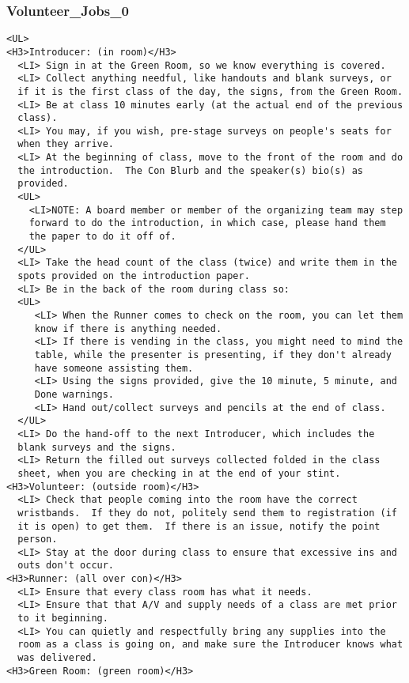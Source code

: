 \documentclass[tablesignature]{scrartcl}
\begin{document}
\subsubsection{Volunteer\_{}Jobs\_{}0}
\label{sec-3_5_5}

\begin{verbatim}
<UL>
<H3>Introducer: (in room)</H3>
  <LI> Sign in at the Green Room, so we know everything is covered.
  <LI> Collect anything needful, like handouts and blank surveys, or
  if it is the first class of the day, the signs, from the Green Room.
  <LI> Be at class 10 minutes early (at the actual end of the previous
  class).
  <LI> You may, if you wish, pre-stage surveys on people's seats for
  when they arrive.
  <LI> At the beginning of class, move to the front of the room and do
  the introduction.  The Con Blurb and the speaker(s) bio(s) as
  provided.
  <UL>
    <LI>NOTE: A board member or member of the organizing team may step
    forward to do the introduction, in which case, please hand them
    the paper to do it off of.
  </UL>
  <LI> Take the head count of the class (twice) and write them in the
  spots provided on the introduction paper.
  <LI> Be in the back of the room during class so:
  <UL>
     <LI> When the Runner comes to check on the room, you can let them
     know if there is anything needed.
     <LI> If there is vending in the class, you might need to mind the
     table, while the presenter is presenting, if they don't already
     have someone assisting them.
     <LI> Using the signs provided, give the 10 minute, 5 minute, and
     Done warnings.
     <LI> Hand out/collect surveys and pencils at the end of class.
  </UL>
  <LI> Do the hand-off to the next Introducer, which includes the
  blank surveys and the signs.
  <LI> Return the filled out surveys collected folded in the class
  sheet, when you are checking in at the end of your stint.
<H3>Volunteer: (outside room)</H3>
  <LI> Check that people coming into the room have the correct
  wristbands.  If they do not, politely send them to registration (if
  it is open) to get them.  If there is an issue, notify the point
  person.
  <LI> Stay at the door during class to ensure that excessive ins and
  outs don't occur.
<H3>Runner: (all over con)</H3>
  <LI> Ensure that every class room has what it needs.
  <LI> Ensure that that A/V and supply needs of a class are met prior
  to it beginning.
  <LI> You can quietly and respectfully bring any supplies into the
  room as a class is going on, and make sure the Introducer knows what
  was delivered.
<H3>Green Room: (green room)</H3>

\end{verbatim}
\end{document}
